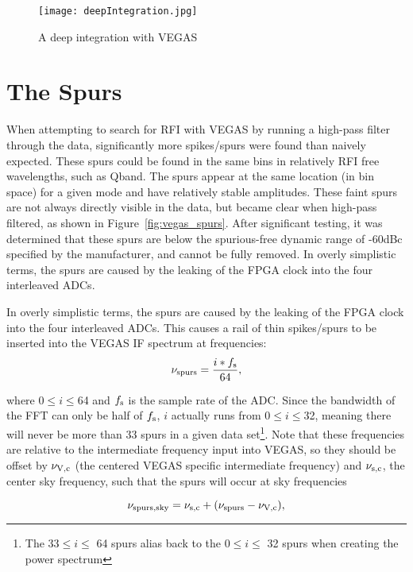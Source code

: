 \begin{figure}[!h]
\begin{center}
\texttt{[image: deepIntegration.jpg]}
\caption[A deep integration with VEGAS]{A deep integration with VEGAS\label{fig:vegas_deep_integrations}} 
\end{center}
\end{figure}


\section{The Spurs}\label{sec:vegas_spurs_detailed}
When attempting to search for \gls{RFI} with VEGAS by running a high-pass
filter through the data, significantly more spikes/spurs were found than
naively expected. These spurs could be found in the same bins in relatively
RFI free wavelengths, such as \gls{Qband}. The spurs appear at the same
location (in bin space) for a given mode and have relatively stable
amplitudes. These faint spurs are not always directly visible in the data,
but became clear when high-pass filtered, as shown in
Figure~\ref{fig:vegas_spurs}. After significant testing, it was determined
that these spurs are below the spurious-free dynamic range of -60dBc
specified by the manufacturer, and cannot be fully removed.
In overly simplistic terms, the spurs are caused by the leaking of the 
\gls{FPGA} clock into the four interleaved \glspl{ADC}.

In overly simplistic terms, the spurs are caused by the leaking of the 
FPGA clock into the four interleaved ADCs. This causes a rail of thin 
spikes/spurs to be inserted into the VEGAS IF spectrum at frequencies:
\begin{equation}
\nu_{\rm spurs}=\frac{i*f_{\rm  s}}{64},
\end{equation}

\noindent where 0$\le i \le$64 and $f_{\rm s}$ is the sample rate of the ADC. 
Since the bandwidth of the FFT can only be half of $f_{\rm s}$, $i$ actually 
runs from 0$\le i \le$32, meaning there will never be more than 33 spurs in 
a given data set\footnote{The 33$\le i \le$ 64 spurs alias back to the 
0$\le i \le$ 32 spurs when creating the power spectrum}. 
Note that these frequencies are relative to the intermediate frequency input 
into VEGAS, so they should be offset by $\nu_{\rm V,c}$ (the centered VEGAS 
specific intermediate frequency) and $\nu_{\rm s,c}$, the center sky 
frequency, such that the spurs will occur at sky frequencies

\begin{equation}\label{eq:vegas_spikeeq}
\nu_{\rm spurs,sky}=\nu_{\rm s,c}+(\nu_{\rm spurs}-\nu_{\rm V,c}),
\end{equation}

